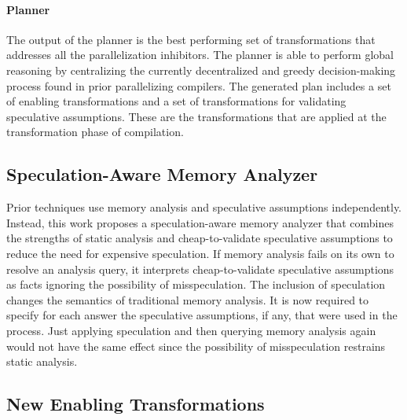 

\paragraph{Planner}

%
The output of the planner is the best performing set of
transformations that addresses all the parallelization inhibitors.
%
The planner is able to perform global reasoning by centralizing the
currently decentralized and greedy decision-making process found in
prior parallelizing compilers.
%
The generated plan includes a set of enabling transformations and a
set of transformations for validating speculative assumptions.
%
These are the transformations that are applied at the transformation
phase of compilation.

\subsection{Speculation-Aware Memory Analyzer}

Prior techniques use memory analysis and speculative assumptions
independently.  Instead, this work proposes a speculation-aware memory
analyzer that combines the strengths of static analysis and
cheap-to-validate speculative assumptions to reduce the need for
expensive speculation.  If memory analysis fails on its own to resolve
an analysis query, it interprets cheap-to-validate speculative
assumptions as facts ignoring the possibility of misspeculation.
%
The inclusion of speculation changes the semantics of traditional
memory analysis. It is now required to specify for each answer the
speculative assumptions, if any, that were used in the process.
%
Just applying speculation and then querying memory analysis again
would not have the same effect since the possibility of misspeculation
restrains static analysis.

\subsection{New Enabling Transformations}

